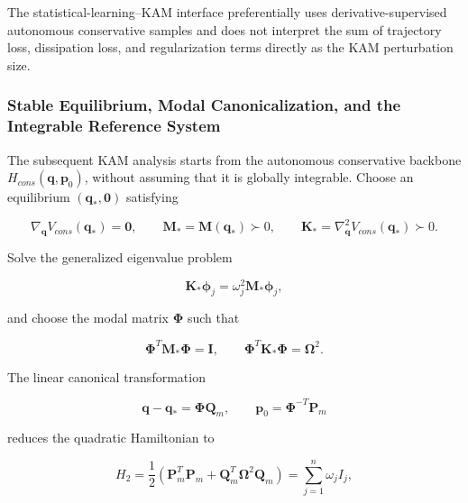 The statistical-learning--KAM interface preferentially uses derivative-supervised autonomous conservative samples and does not interpret the sum of trajectory loss, dissipation loss, and regularization terms directly as the KAM perturbation size.\cite{Chen2022KAMSLT}

\subsubsection{Stable Equilibrium, Modal Canonicalization, and the Integrable Reference System}\label{sec:hamiltonian-3-7-3}

The subsequent KAM analysis starts from the autonomous conservative backbone \(H_{cons}\left( \mathbf{q},\mathbf{p}_{0} \right)\), without assuming that it is globally integrable. Choose an equilibrium \(\left(\mathbf{q}_{*},\mathbf{0}\right)\) satisfying

\begin{equation}
\label{eq:hamiltonian-3-76}
\nabla_{\mathbf{q}}V_{cons}\left( \mathbf{q}_{*} \right) = \mathbf{0},\quad\quad\mathbf{M}_{*} = \mathbf{M}\left( \mathbf{q}_{*} \right) \succ 0,\quad\quad\mathbf{K}_{*} = \nabla_{\mathbf{q}}^{2}V_{cons}\left( \mathbf{q}_{*} \right) \succ 0.
\end{equation}

Solve the generalized eigenvalue problem

\begin{equation}
\label{eq:hamiltonian-3-77}
\mathbf{K}_{*}\bm{\phi}_{j} = \omega_{j}^{2}\mathbf{M}_{*}\bm{\phi}_{j},
\end{equation}

and choose the modal matrix \(\bm{\Phi}\) such that

\begin{equation}
\label{eq:hamiltonian-3-78}
\bm{\Phi}^{T}\mathbf{M}_{*}\bm{\Phi} = \mathbf{I},\quad\quad\bm{\Phi}^{T}\mathbf{K}_{*}\bm{\Phi} = \bm{\Omega}^{2}.
\end{equation}

The linear canonical transformation

\begin{equation}
\label{eq:hamiltonian-3-79}
\mathbf{q} - \mathbf{q}_{*} = \bm{\Phi}\mathbf{Q}_{m},\quad\quad\mathbf{p}_{0} = \bm{\Phi}^{- T}\mathbf{P}_{m}
\end{equation}

reduces the quadratic Hamiltonian to

\begin{equation}
\label{eq:hamiltonian-3-80}
H_{2} = \frac{1}{2}\left( \mathbf{P}_{m}^{T}\mathbf{P}_{m} + \mathbf{Q}_{m}^{T}\bm{\Omega}^{2}\mathbf{Q}_{m} \right) = \sum_{j = 1}^{n}\omega_{j}I_{j},
\end{equation}

